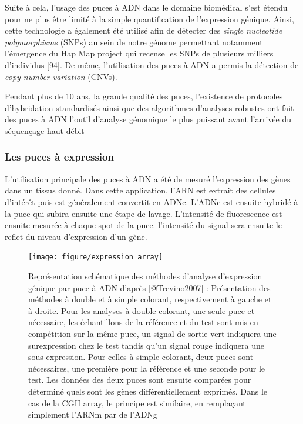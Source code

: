 \documentclass[12pt,twoside]{reedthesis}
\theoremstyle{definition}
\theoremstyle{definition}
\theoremstyle{remark}
\begin{document}
  Suite à cela, l'usage des puces à ADN dans le domaine biomédical s'est
  étendu pour ne plus être limité à la simple quantification de
  l'expression génique. Ainsi, cette technologie a également été utilisé
  afin de détecter des \emph{single nucleotide polymorphisms} (SNPs) au
  sein de notre génome permettant notamment l'émergence du Hap Map project
  qui recense les SNPs de plusieurs milliers d'individus
  {[}\protect\hyperlink{ref-Cutler2001}{94}{]}. De même, l'utilisation des
  puces à ADN a permis la détection de \emph{copy number variation}
  (CNVs).
  
  Pendant plus de 10 ans, la grande qualité des puces, l'existence de
  protocoles d'hybridation standardisés ainsi que des algorithmes
  d'analyses robustes ont fait des puces à ADN l'outil d'analyse génomique
  le plus puissant avant l'arrivée du \protect\hyperlink{ngs}{séquençage
  haut débit}
  
  \newpage
  
  \subsubsection{Les puces à expression}\label{les-puces-a-expression}
  
  L'utilisation principale des puces à ADN a été de mesuré l'expression
  des gènes dans un tissus donné. Dans cette application, l'ARN est
  extrait des cellules d'intérêt puis est généralement convertit en ADNc.
  L'ADNc est ensuite hybridé à la puce qui subira ensuite une étape de
  lavage. L'intensité de fluorescence est ensuite mesurée à chaque spot de
  la puce. l'intensité du signal sera ensuite le reflet du niveau
  d'expression d'un gène.
  
  \begin{figure}
  
  {\centering \texttt{[image: figure/expression\_array]} 
  
  }
  
  \caption[Représentation schématique des méthodes d'analyse d'expression génique par puce à ADN]{Représentation schématique des méthodes d'analyse d'expression génique par puce à ADN d'après [@Trevino2007] : Présentation des méthodes à double et à simple colorant, respectivement à gauche et à droite. Pour les analyses à double colorant, une seule puce et nécessaire, les échantillons de la référence et du test sont mis en compétition sur la même puce, un signal de sortie vert indiquera une surexpression chez le test tandis qu'un signal rouge indiquera une sous-expression. Pour celles à simple colorant, deux puces sont nécessaires, une première pour la référence et une seconde pour le test. Les données des deux puces sont ensuite comparées pour déterminé quels sont les gènes différentiellement exprimés. Dans le cas de la CGH array, le principe est similaire, en remplaçant simplement l'ARNm par de l'ADNg}\label{fig:figexparray}
  \end{figure}
  
\end{document}

